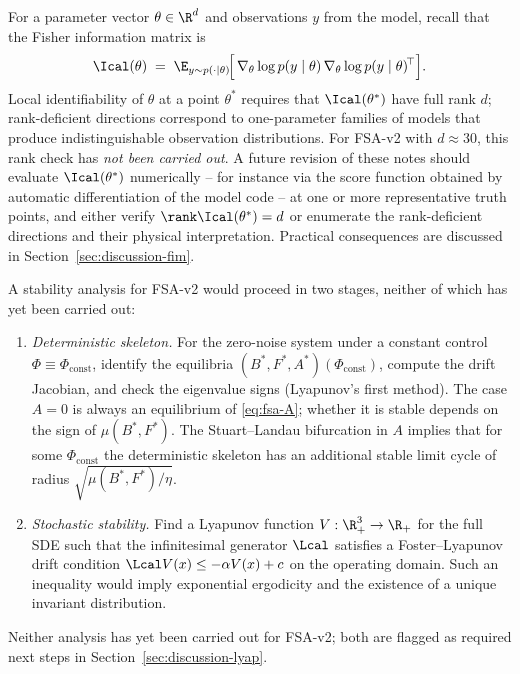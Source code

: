 \begin{remark}\label{rem:fim}
For a parameter vector $\theta \in \R^d$ and observations $y$ from the
model, recall that the Fisher information matrix is
\begin{equation}
  \Ical(\theta) \;=\;
    \E_{y\sim p(\cdot\mid\theta)}
    \!\Bigl[\,\nabla_\theta \log p(y\mid\theta)\,
              \nabla_\theta \log p(y\mid\theta)^{\!\top}\Bigr]. \label{eq:fim}
\end{equation}
Local identifiability of $\theta$ at a point $\theta^*$ requires that
$\Ical(\theta^*)$ have full rank $d$; rank-deficient directions
correspond to one-parameter families of models that produce
indistinguishable observation distributions. For FSA-v2 with $d \approx
30$, this rank check has \emph{not been carried out}. A future revision
of these notes should evaluate $\Ical(\theta^*)$ numerically -- for
instance via the score function obtained by automatic differentiation of
the model code -- at one or more representative truth points, and either
verify $\rank \Ical(\theta^*)=d$ or enumerate the rank-deficient
directions and their physical interpretation. Practical consequences are
discussed in Section~\ref{sec:discussion-fim}.
\end{remark}

\begin{remark}\label{rem:lyap}
A stability analysis for FSA-v2 would proceed in two stages, neither of
which has yet been carried out:
\begin{enumerate}
  \item[(a)] \emph{Deterministic skeleton.} For the zero-noise system
    under a constant control $\Phi \equiv \Phi_{\mathrm{const}}$, identify
    the equilibria $(B^*,F^*,A^*)(\Phi_{\mathrm{const}})$, compute the drift
    Jacobian, and check the eigenvalue signs (Lyapunov's first method).
    The case $A=0$ is always an equilibrium of \eqref{eq:fsa-A}; whether
    it is stable depends on the sign of $\mu(B^*,F^*)$. The Stuart--Landau
    bifurcation in $A$ implies that for some
    $\Phi_{\mathrm{const}}$ the deterministic skeleton has an additional
    stable limit cycle of radius $\sqrt{\mu(B^*,F^*)/\eta}$.
  \item[(b)] \emph{Stochastic stability.} Find a Lyapunov function
    $V:\R^3_+ \to \R_+$ for the full SDE such that the infinitesimal
    generator $\Lcal$ satisfies a Foster--Lyapunov drift condition
    $\Lcal V(x) \le -\alpha V(x) + c$ on the operating domain. Such an
    inequality would imply exponential ergodicity and the existence of a
    unique invariant distribution.
\end{enumerate}
Neither analysis has yet been carried out for FSA-v2; both are flagged
as required next steps in Section~\ref{sec:discussion-lyap}.
\end{remark}
